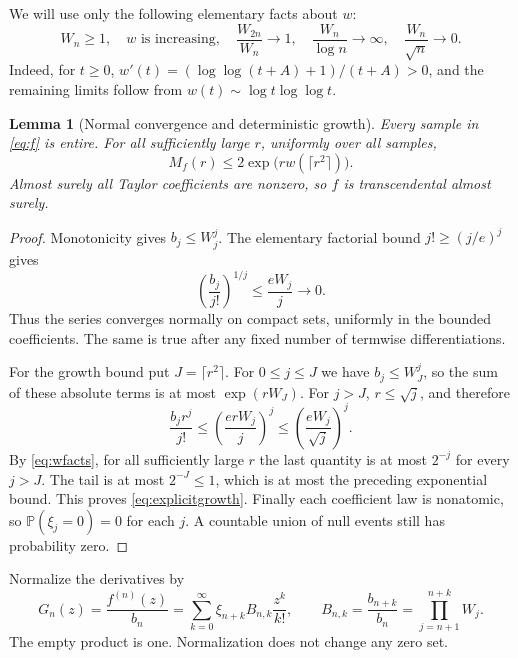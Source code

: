 \documentclass[11pt]{article}
\newtheorem{lemma}[theorem]{Lemma}
\theoremstyle{remark}
\newcommand{\Prob}{\mathbb P}
\begin{document}
We will use only the following elementary facts about $w$:
\begin{equation}\label{eq:wfacts}
 W_n\geq1,\quad w\text{ is increasing},\quad
 \frac{W_{2n}}{W_n}\longrightarrow1,\quad
 \frac{W_n}{\log n}\longrightarrow\infty,\quad
 \frac{W_n}{\sqrt n}\longrightarrow0.
\end{equation}
Indeed, for $t\geq0$,
$w'(t)=(\log\log(t+A)+1)/(t+A)>0$, and the remaining
limits follow from $w(t)\sim\log t\log\log t$.

\begin{lemma}[Normal convergence and deterministic growth]
\label{lem:entire}
Every sample in \eqref{eq:f} is entire. For all sufficiently large $r$,
uniformly over all samples,
\begin{equation}\label{eq:explicitgrowth}
 M_f(r)\leq2\exp\!\bigl(rw(\lceil r^2\rceil)\bigr).
\end{equation}
Almost surely all Taylor coefficients are nonzero, so $f$ is
transcendental almost surely.
\end{lemma}
\begin{proof}
Monotonicity gives $b_j\leq W_j^j$. The elementary factorial bound
$j!\geq(j/e)^j$ gives
\[
 \left(\frac{b_j}{j!}\right)^{1/j}\leq\frac{eW_j}{j}
 \longrightarrow0.
\]
Thus the series converges normally on compact sets, uniformly in the
bounded coefficients. The same is true after any fixed number of
termwise differentiations.

For the growth bound put $J=\lceil r^2\rceil$.
For $0\leq j\leq J$ we have $b_j\leq W_J^j$, so the sum of
these absolute terms is at most $\exp(rW_J)$.
For $j>J$, $r\leq\sqrt j$, and therefore
\[
 \frac{b_jr^j}{j!}
 \leq\left(\frac{erW_j}{j}\right)^j
 \leq\left(\frac{eW_j}{\sqrt j}\right)^j.
\]
By \eqref{eq:wfacts}, for all sufficiently large $r$ the last
quantity is at most $2^{-j}$ for every $j>J$.
The tail is at most $2^{-J}\leq1$, which is at most the preceding
exponential bound. This proves \eqref{eq:explicitgrowth}.
Finally each coefficient law is nonatomic, so
$\Prob(\xi_j=0)=0$ for each $j$. A countable union of null events
still has probability zero.
\end{proof}

Normalize the derivatives by
\begin{equation}\label{eq:G}
 G_n(z)=\frac{f^{(n)}(z)}{b_n}
 =\sum_{k=0}^\infty\xi_{n+k}B_{n,k}\frac{z^k}{k!},\qquad
 B_{n,k}=\frac{b_{n+k}}{b_n}
 =\prod_{j=n+1}^{n+k}W_j.
\end{equation}
The empty product is one. Normalization does not change any zero set.
\end{document}
